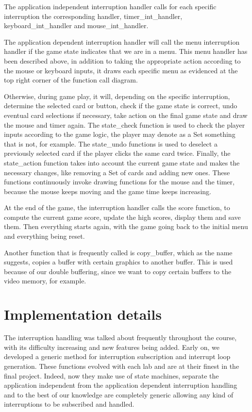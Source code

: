 \documentclass[11pt,a4paper,reqno]{report}
\numberwithin{equation}{section}
\begin{document}
The application independent interruption handler calls for each specific interruption the corresponding handler, timer\_int\_handler, keyboard\_int\_handler and mouse\_int\_handler. 

The application dependent interruption handler will call the menu interruption handler if the game state indicates that we are in a menu. This menu handler has been described above, in addition to taking the appropriate action according to the mouse or keyboard inputs, it draws each specific menu as evidenced at the top right corner of the function call diagram.

Otherwise, during game play, it will, depending on the specific interruption, determine the selected card or button, check if the game state is correct, undo eventual card selections if necessary, take action on the final game state and draw the mouse and timer again. The state\_check function is used to check the player inputs according to the game logic, the player may denote as a Set something that is not, for example. The state\_undo functions is used to deselect a previously selected card if the player clicks the same card twice. Finally, the state\_action function takes into account the current game state and makes the necessary changes, like removing a Set of cards and adding new ones. These functions continuously invoke drawing functions for the mouse and the timer, because the mouse keeps moving and the game time keeps increasing.

At the end of the game, the interruption handler calls the score function, to compute the current game score, update the high scores, display them and save them. Then everything starts again, with the game going back to the initial menu and everything being reset.

Another function that is frequently called is copy\_buffer, which as the name suggests, copies a buffer with certain graphics to another buffer. This is used because of our double buffering, since we want to copy certain buffers to the video memory, for example.

\chapter{Implementation details}

The interruption handling was talked about frequently throughout the course, with its difficulty increasing and new features being added. Early on, we developed a generic method for interruption subscription and interrupt loop generation. These functions evolved with each lab and are at their finest in the final project. Indeed, now they make use of state machines, separate the application independent from the application dependent interruption handling and to the best of our knowledge are completely generic allowing any kind of interruptions to be subscribed and handled.
\end{document}
